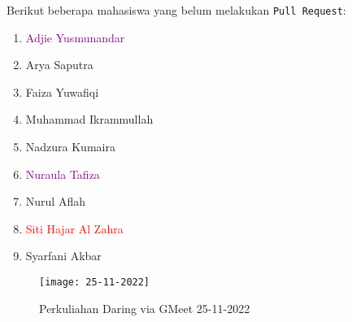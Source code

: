 \documentclass[a4paper]{tufte-handout}
\begin{document}
\noindent
Berikut beberapa mahasiswa yang belum melakukan {\tt Pull Request}:
\begin{multicols}{3}
\begin{enumerate}
\item \textcolor{purple}{Adjie Yusmunandar}
\item Arya Saputra
\item Faiza Yuwafiqi
\item Muhammad Ikrammullah
\item Nadzura Kumaira
\item \textcolor{purple}{Nuraula Tafiza}
\item Nurul Aflah
\item \textcolor{red}{Siti Hajar Al Zahra}
\item Syarfani Akbar
\end{enumerate}
\end{multicols}

\begin{figure}[!ht]
\texttt{[image: 25-11-2022]}
\caption{Perkuliahan Daring via GMeet 25-11-2022}
\label{gam:form-ssh}
\end{figure}

\clearpage
{}

\end{document}
